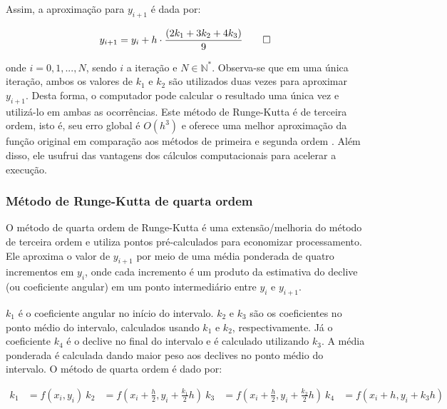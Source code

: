 Assim, a aproximação para $y_{i+1}$ é dada por:

\begin{equation}
	y_{i + 1} = y_i + h \cdot \frac{(2k_1 + 3k_2 + 4k_3)}{9} \qedhere
\end{equation}

onde $i = 0, 1,...,N$, sendo $i$ a iteração e $N \in \mathbb{N}^*$. Observa-se que em uma única iteração, ambos os valores de $k_1$ e $k_2$ são utilizados duas vezes para aproximar $y_{i+1}$. Desta forma, o computador pode calcular o resultado uma única vez e utilizá-lo em ambas as ocorrências.
Este método de Runge-Kutta é de terceira ordem, isto é, seu erro global é $O(h^3)$ e oferece uma melhor aproximação da função original em comparação aos métodos de primeira e segunda ordem \cite{leveque2007finitediff}. Além disso, ele usufrui das vantagens dos cálculos computacionais para acelerar a execução.

\subsubsection{Método de Runge-Kutta de quarta ordem}\label{sec:4th-order-runge-kutta} \quad
O método de quarta ordem de Runge-Kutta é uma extensão/melhoria do método de terceira ordem e utiliza pontos pré-calculados para economizar processamento. Ele aproxima o valor de $y_{i+1}$ por meio de uma média ponderada de quatro incrementos em $y_i$, onde cada incremento é um produto da estimativa do declive (ou coeficiente angular) em um ponto intermediário entre $y_i$ e $y_{i+1}$.

$k_1$ é o coeficiente angular no início do intervalo. $k_2$ e $k_3$ são os coeficientes no ponto médio do intervalo, calculados usando $k_1$ e $k_2$, respectivamente. Já o coeficiente $k_4$ é o declive no final do intervalo e é calculado utilizando $k_3$. A média ponderada é calculada dando maior peso aos declives no ponto médio do intervalo. O método de quarta ordem é dado por:

\begin{equation}
\begin{aligned}
k_1 &= f(x_i, y_i)\
k_2 &= f\left(x_i + \frac{h}{2}, y_i + \frac{k_1}{2}h\right)\
k_3 &= f\left(x_i + \frac{h}{2}, y_i + \frac{k_2}{2}h\right)\
k_4 &= f\left(x_i + h, y_i + k_3h\right)
\end{aligned}
\end{equation}

